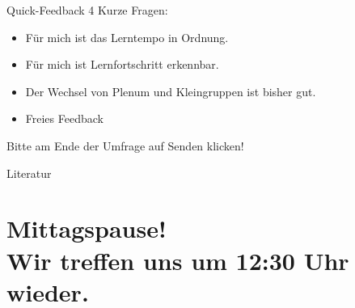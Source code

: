 \documentclass[11pt]{beamer}
\begin{document}
\begin{frame}[t]{Quick-Feedback}
4 Kurze Fragen: 

\begin{itemize}
	\item Für mich ist das Lerntempo in Ordnung.
	\item Für mich ist Lernfortschritt erkennbar.
	\item Der Wechsel von Plenum und Kleingruppen ist bisher gut.
	\item Freies Feedback
\end{itemize}

Bitte am Ende der Umfrage auf Senden klicken!

\end{frame}

\renewcommand*{\bibfont}{\scriptsize}

\begin{frame}[allowframebreaks]{Literatur}
	\nocite{*}
	\printbibliography[heading = none]
\end{frame}

\section{Mittagspause! \\ Wir treffen uns um 12:30 Uhr wieder.}
\end{document}
